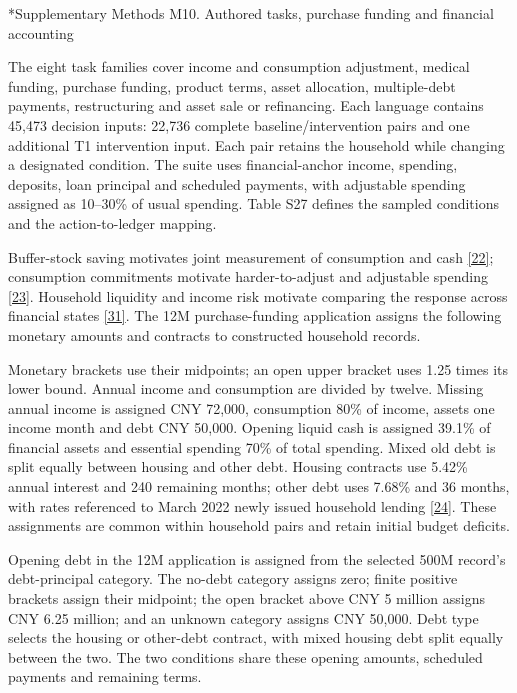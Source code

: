 \documentclass[10pt]{article}
\makeatletter
\renewcommand\section{\@startsection{section}{1}{\z@}{-2.2ex plus -1ex minus -.2ex}{.9ex plus .2ex}{\normalfont\large\mdseries}}
\makeatother
\begin{document}
\section*{Supplementary Methods M10. Authored tasks, purchase funding and financial accounting}

The eight task families cover income and consumption adjustment, medical funding, purchase funding, product terms, asset allocation, multiple-debt payments, restructuring and asset sale or refinancing. Each language contains 45,473 decision inputs: 22,736 complete baseline/intervention pairs and one additional T1 intervention input. Each pair retains the household while changing a designated condition. The suite uses financial-anchor income, spending, deposits, loan principal and scheduled payments, with adjustable spending assigned as 10--30\% of usual spending. Table S27 defines the sampled conditions and the action-to-ledger mapping.

Buffer-stock saving motivates joint measurement of consumption and cash \href{https://academic.oup.com/qje/article-abstract/112/1/1/1870884}{[22]}; consumption commitments motivate harder-to-adjust and adjustable spending \href{https://academic.oup.com/qje/article-abstract/122/2/831/1942152}{[23]}. Household liquidity and income risk motivate comparing the response across financial states \href{https://www.aeaweb.org/articles?id=10.1257/aer.20160042}{[31]}. The 12M purchase-funding application assigns the following monetary amounts and contracts to constructed household records.

Monetary brackets use their midpoints; an open upper bracket uses 1.25 times its lower bound. Annual income and consumption are divided by twelve. Missing annual income is assigned CNY 72,000, consumption 80\% of income, assets one income month and debt CNY 50,000. Opening liquid cash is assigned 39.1\% of financial assets and essential spending 70\% of total spending. Mixed old debt is split equally between housing and other debt. Housing contracts use 5.42\% annual interest and 240 remaining months; other debt uses 7.68\% and 36 months, with rates referenced to March 2022 newly issued household lending \href{https://app.www.gov.cn/govdata/gov/202205/07/484673/article.html}{[24]}. These assignments are common within household pairs and retain initial budget deficits.

Opening debt in the 12M application is assigned from the selected 500M record's debt-principal category. The no-debt category assigns zero; finite positive brackets assign their midpoint; the open bracket above CNY 5 million assigns CNY 6.25 million; and an unknown category assigns CNY 50,000. Debt type selects the housing or other-debt contract, with mixed housing debt split equally between the two. The two conditions share these opening amounts, scheduled payments and remaining terms.
\end{document}
